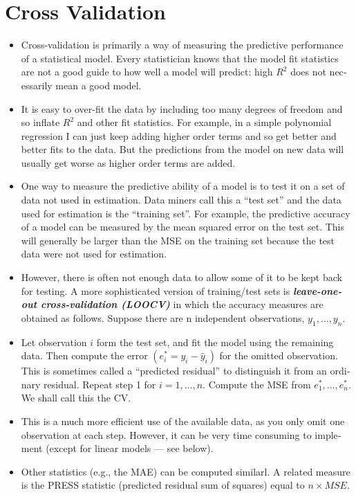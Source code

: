 \documentclass[a4paper,12pt]{article}
\begin{document}
\section*{Cross Validation}
\begin{itemize}
\item
Cross-​​validation is pri­mar­ily a way of mea­sur­ing the pre­dic­tive per­for­mance of a sta­tis­ti­cal model. Every sta­tis­ti­cian knows that the model fit sta­tis­tics are not a good guide to how well a model will pre­dict: high $R^2$ does not nec­es­sar­ily mean a good model. 
\item It is easy to over-​​fit the data by includ­ing too many degrees of free­dom and so inflate $R^2$ and other fit sta­tis­tics. For exam­ple, in a sim­ple poly­no­mial regres­sion I can just keep adding higher order terms and so get bet­ter and bet­ter fits to the data. But the pre­dic­tions from the model on new data will usu­ally get worse as higher order terms are added.
\item
One way to mea­sure the pre­dic­tive abil­ity of a model is to test it on a set of data not used in esti­ma­tion. Data min­ers call this a “test set” and the data used for esti­ma­tion is the “train­ing set”. For exam­ple, the pre­dic­tive accu­racy of a model can be mea­sured by the mean squared error on the test set. This will gen­er­ally be larger than the MSE on the train­ing set because the test data were not used for estimation.
\item
How­ever, there is often not enough data to allow some of it to be kept back for test­ing. A more sophis­ti­cated ver­sion of training/​​test sets is \textit{\textbf{leave-​​one-​​out cross-​​​​validation (LOOCV)}} in which the accu­racy mea­sures are obtained as fol­lows. Sup­pose there are n inde­pen­dent obser­va­tions, $y_1,\dots,y_n$.
\item
Let obser­va­tion $i$ form the test set, and fit the model using the remain­ing data. Then com­pute the error $(e_{i}^*=y_{i}-\hat{y}_{i})$ for the omit­ted obser­va­tion. This is some­times called a “pre­dicted resid­ual” to dis­tin­guish it from an ordi­nary residual.
Repeat step 1 for $i=1,\dots,n$.
Com­pute the MSE from $e_{1}^*,\dots,e_{n}^*$. We shall call this the CV.
\item
This is a much more effi­cient use of the avail­able data, as you only omit one obser­va­tion at each step. How­ever, it can be very time con­sum­ing to imple­ment (except for lin­ear mod­els — see below).
\item 
Other sta­tis­tics (e.g., the MAE) can be com­puted sim­i­larl. A related mea­sure is the PRESS sta­tis­tic (pre­dicted resid­ual sum of squares) equal to $n \times MSE$.
\end{itemize}
\end{document}

